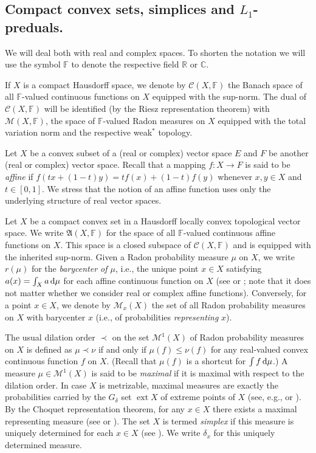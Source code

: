 \documentclass{amsart}
\numberwithin{equation}{section}
\theoremstyle{definition}
\def\fra{\mathfrak{A}}
\def\C{\mathcal C}
\def\M{\mathcal M}
\def\ce{\mathbb C}
\def\ef{\mathbb F}
\def\er{\mathbb R}
\def \ext {\operatorname{ext}}
\def\di{\,\mbox{\rm d}}
\begin{document}
\subsection{Compact convex sets, simplices and $L_1$-preduals.}\label{ssec:choquet}
We will deal both with real and complex spaces. To shorten the notation we will use the symbol $\ef$ to denote the respective field $\er$ or $\ce$.

If $X$ is a compact Hausdorff space, we denote by $\C(X,\ef)$ the Banach space of all $\ef$-valued continuous functions on $X$ equipped with the sup-norm. The dual of $\C(X,\ef)$ will be identified (by the Riesz representation theorem) with $\M(X,\ef)$, the space of $\ef$-valued Radon measures on $X$ equipped with the total variation norm and the respective weak$^*$ topology.

Let $X$ be a convex subset of a (real or complex) vector space $E$ and $F$ be another (real or complex) vector space. Recall that a mapping $f\colon X\to F$ is said to be \emph{affine} if $f(tx+(1-t)y)=tf(x)+(1-t)f(y)$ whenever $x,y\in X$ and $t\in[0,1]$. We stress that the notion of an affine function uses only the underlying structure of real vector spaces.

Let $X$ be a compact convex set in a Hausdorff locally convex topological vector space. We write $\fra(X,\ef)$ for the space of all $\ef$-valued continuous affine functions on $X$. This space is a closed subspace of $\C(X,\ef)$ and is equipped with the inherited sup-norm. Given a Radon probability measure $\mu$ on $X$, we write $r(\mu)$ for the \emph{barycenter of $\mu$}, i.e., the unique point $x\in X$ satisfying $a(x)=\int_X a \di\mu$ for each affine continuous function on $X$ (see \cite[Proposition~I.2.1]{alfsen} or \cite[Chapter 7, \S\,20]{lacey}; note that it does not matter whether we consider real or complex affine functions). Conversely, for a point $x\in X$, we denote by $\M_{x}(X)$ the set of all Radon probability measures on $X$ with barycenter $x$ (i.e., of probabilities \emph{representing} $x$).

The usual dilation order $\prec$ on the set $\M^1(X)$ of Radon probability measures on $X$ is defined as $\mu\prec \nu$ if and only if $\mu(f)\le \nu(f)$ for any real-valued convex continuous function $f$ on $X$. (Recall that $\mu(f)$ is a shortcut for $\int f\di\mu$.)  A measure $\mu\in \M^1(X)$ is said to be \emph{maximal} if it is maximal with respect to the dilation order.
In case $X$ is metrizable, maximal measures are exactly the probabilities carried by the $G_\delta$ set $\ext X$ of extreme points of $X$ (see, e.g., \cite[p. 35]{alfsen} or \cite[Corollary 3.62]{lmns}). By the Choquet representation theorem, for any $x\in X$ there exists a maximal representing measure (see \cite[p. 192, Corollary]{lacey} or \cite[Theorem I.4.8]{alfsen}). The set $X$ is termed \emph{simplex} if this measure is uniquely determined for each $x\in X$ (see \cite[\S 20, Theorem 3]{lacey}). We write $\delta_x$ for this uniquely determined measure.
\end{document}
